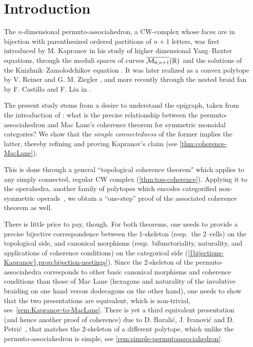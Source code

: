 
\section*{Introduction} 
\label{s:introduction}

The $n$-dimensional permuto-associahedron, a CW-complex whose faces are in bijection with parenthesized ordered partitions of $n+1$ letters, was first introduced by M. Kapranov in his study of higher dimensional Yang--Baxter equations, through the moduli spaces of curves $\overline{\mathcal{M}_{0,n+1}}(\mathbb R)$ and the solutions of the Knizhnik--Zamolodchikov equation \cite{kapranov1993}.
It was later realized as a convex polytope by V. Reiner and G. M. Ziegler \cite{reinerCoxeterassociahedra1994}, and more recently through the nested braid fan by F. Castillo and F. Liu in \cite{CastilloLiu21}.

The present study stems from a desire to understand the epigraph, taken from the introduction of \cite{kapranov1993}: what is the precise relationship between the permuto-associahedron and Mac Lane's coherence theorem for symmetric monoidal categories? 
We show that the \emph{simple connectedness} of the former implies the latter, thereby refining and proving Kapranov's claim (see \cref{thm:coherence-MacLane}). 

This is done through a general ``topological coherence theorem" which applies to any simply connected, regular CW complex (\cref{thm:top-coherence}).
Applying it to the operahedra, another family of polytopes which encodes categorified non-symmetric operads~\cite{DP15,curienSyntacticAspectsHypergraph2019a,laplante-anfossiDiagonalOperahedra2022a}, we obtain a ``one-step'' proof of the associated coherence theorem as well.

\smallskip
There is little price to pay, though. 
For both theorems, one needs to provide a precise bijective correspondence between the 1-skeleton (resp.\ the 2--cells) on the topological side, and canonical morphisms (resp.\ bifunctoriality, naturality, and applications of coherence conditions) on the categorical side (\cref{{bijections-Kapranov},prop:bijection-nestings}). 
Since the 2-skeleton of the permuto-associahedra corresponds to other basic canonical morphisms and coherence conditions than those of Mac Lane (hexagons and naturality of the involutive braiding on one hand versus dodecagons on the other hand), one needs to show that the two presentations are equivalent, which is non-trivial, see~\cref{rem:Kapranov-to-MacLane}.  
There is yet a third equivalent presentation (and hence another proof of coherence) due to D. Barali\'c, J. Ivanovi\'c and D. Petri\'c~\cite{baralicSimplePermutoassociahedron2019}, that matches the 2-skeleton of a different polytope, which unlike the permuto-associahedron is simple, see \cref{rem:simple-permutoassociahedron}.

